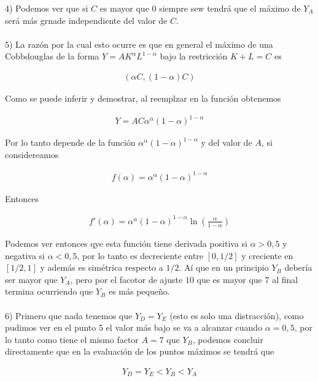 \documentclass{article}
\theoremstyle{definition}
\begin{document}
4) Podemos ver que si $C$ es mayor que $0$ siempre sew tendrá que el máximo de $Y_A$ será más grnade independiente del valor de $C$. \\\\


5) La razón por la cual esto ocurre es que en general el máximo de una Cobbdouglas de la forma $Y=AK^{\alpha}L^{1-\alpha}$ bajo la restricción $K+L=C$ es

\begin{align*}
    (\alpha C, (1-\alpha)C )
\end{align*}

Como se puede inferir y demostrar, al reemplzar en la función obtenemos

\begin{align*}
    Y = AC\alpha^\alpha(1-\alpha)^{1-\alpha}
\end{align*}

Por lo tanto depende de la función $\alpha^\alpha(1-\alpha)^{1-\alpha}$ y del valor de $A$, si considereamos

\begin{align*}
    f(\alpha) =  \alpha^\alpha(1-\alpha)^{1-\alpha}
\end{align*}

Entonces

\begin{align*}
    f'(\alpha) =  \alpha^\alpha(1-\alpha)^{1-\alpha} \ln\left( \frac{\alpha}{1-\alpha}\right)
\end{align*}

Podemos ver entonces qye esta función tiene derivada positiva si $\alpha > 0,5$ y negativa si $\alpha < 0,5$, por lo tanto es decreciente entre $[0,1/2]$ y creciente en $[1/2,1]$ y además es simétrica respecto a $1/2$. Aí que en un principio $Y_B$ debería ser mayor que $Y_A$, pero por el facotor de ajuste $10$ que es mayor que $7$ al final termina ocurriendo que $Y_B$ es más pequeño. \\ \\

6) Primero que nada tenemos que $Y_D=Y_E$ (esto es solo una distracción), como pudimos ver en el punto 5 el valor más bajo se va a alcanzar cuando $\alpha=0,5$, por lo tanto como tiene el mismo factor $A=7$ que $Y_B$, podemos concluir directamente que en la evaluación de los puntos máximos se tendrá que

\begin{align*}
    Y_D=Y_E < Y_B < Y_A
\end{align*}
\end{document}
